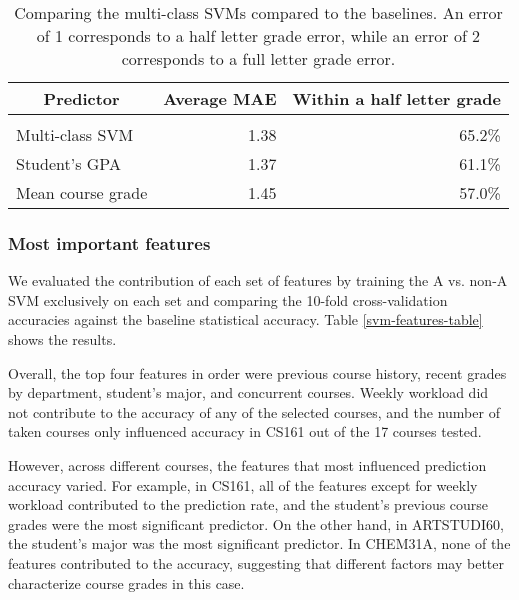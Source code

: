 \begin{table}[htbp]\scriptsize
\label{svm-mae-table}
\begin{center}
\begin{tabular}{lrr}
\multicolumn{1}{c}{\bf Predictor}  &\multicolumn{1}{c}{\bf Average MAE}  &\multicolumn{1}{c}{\bf Within a half letter grade}
\\ \hline \\
Multi-class SVM &1.38 & 65.2\%\\
Student's GPA   &1.37 & 61.1\%\\
Mean course grade &1.45 &57.0\% \\
\end{tabular}
\caption{Comparing the multi-class SVMs compared to the baselines. An error of 1 corresponds to a half letter grade error, while an error of 2 corresponds to a full letter grade error.}
\end{center}
\end{table}


\subsubsection{Most important features}

We evaluated the contribution of each set of features by training the A vs. non-A SVM exclusively on each set  and comparing the 10-fold cross-validation accuracies against the baseline statistical accuracy. Table \ref{svm-features-table} shows the results.

Overall, the top four features in order were previous course history, recent grades by department, student's major, and concurrent courses. Weekly workload did not contribute to the accuracy of any of the selected courses, and the number of taken courses only influenced accuracy in CS161 out of the 17 courses tested.

However, across different courses, the features that most influenced prediction accuracy varied. For example, in CS161, all of the features except for weekly workload contributed to the prediction rate, and the student's previous course grades were the most significant predictor. On the other hand, in ARTSTUDI60, the student's major was the most significant predictor. In CHEM31A, none of the features contributed to the accuracy, suggesting that different factors may better characterize course grades in this case.


